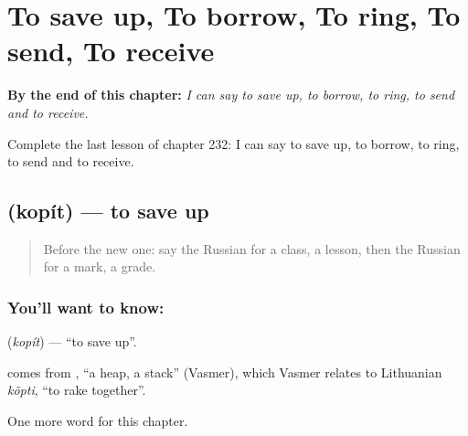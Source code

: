 
\chapter{To save up, To borrow, To ring, To send, To receive}
\label{ch:ru-to-save-up-to-borrow-to-ring-to-send-to-receive}

\begin{chapteropening}
\textbf{By the end of this chapter:} \emph{I can say to save up, to borrow, to ring, to send and to receive.}

Complete the last lesson of chapter 232: I can say to save up, to borrow, to ring, to send and to receive.
\end{chapteropening}

\section[\texorpdfstring{\ru{копить} (kopít)}{копить (kopít)}]{ (kopít) — to save up}

\label{lesson:RU-C232-kopit}



\begin{quote}
Before the new one: say the Russian for a class, a lesson, then the Russian for a mark, a grade.
\end{quote}

\subsection*{You'll want to know: }
\textbf{} (\emph{kopít}) — \textquotedblleft{}to save up\textquotedblright{}.

\begin{cousinweb}
\textbf{} comes from \emph{}, \textquotedblleft{}a heap, a stack\textquotedblright{} (Vasmer), which Vasmer relates to Lithuanian \emph{kõpti}, \textquotedblleft{}to rake together\textquotedblright{}.
\end{cousinweb}

\begin{grammarlens}[title={What you've built}]
One more word for this chapter.
\end{grammarlens}

